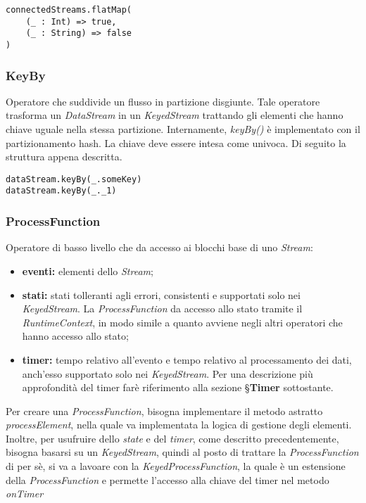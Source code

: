 \begin{verbatim}
connectedStreams.flatMap(
    (_ : Int) => true,
    (_ : String) => false
)
\end{verbatim}

\subsubsection{KeyBy}
Operatore che suddivide un flusso in partizione disgiunte. Tale operatore trasforma un \textit{DataStream} in un \textit{KeyedStream} trattando gli elementi che hanno chiave uguale nella stessa partizione. Internamente, \textit{keyBy()} è implementato con il partizionamento hash.
La chiave deve essere intesa come univoca.
Di seguito la struttura appena descritta.
\begin{verbatim}
dataStream.keyBy(_.someKey)
dataStream.keyBy(_._1)
\end{verbatim}

\subsubsection{ProcessFunction}
Operatore di basso livello che da accesso ai blocchi base di uno \textit{Stream}:
\begin{itemize}
	\item{\textbf{eventi:} elementi dello \textit{Stream};}
	\item{\textbf{stati:} stati tolleranti agli errori, consistenti e supportati solo nei \textit{KeyedStream}. La \textit{ProcessFunction} da accesso allo stato tramite il \textit{RuntimeContext}, in modo simile a quanto avviene negli altri operatori che hanno accesso allo stato;}
	\item{\textbf{timer:} tempo relativo all'evento e tempo relativo al processamento dei dati, anch'esso supportato solo nei \textit{KeyedStream}. Per una descrizione più approfondità del timer farè riferimento alla sezione \S\textbf{Timer} sottostante.}
\end{itemize}

Per creare una \textit{ProcessFunction}, bisogna implementare il metodo astratto \textit{processElement}, nella quale va implementata la logica di gestione degli elementi. Inoltre, per usufruire dello \textit{state} e del \textit{timer}, come descritto precedentemente, bisogna basarsi su un \textit{KeyedStream}, quindi al posto di trattare la \textit{ProcessFunction} di per sè, si va a lavoare con la \textit{KeyedProcessFunction}, la quale è un estensione della \textit{ProcessFunction} e permette l'accesso alla chiave del timer nel metodo \textit{onTimer} 

